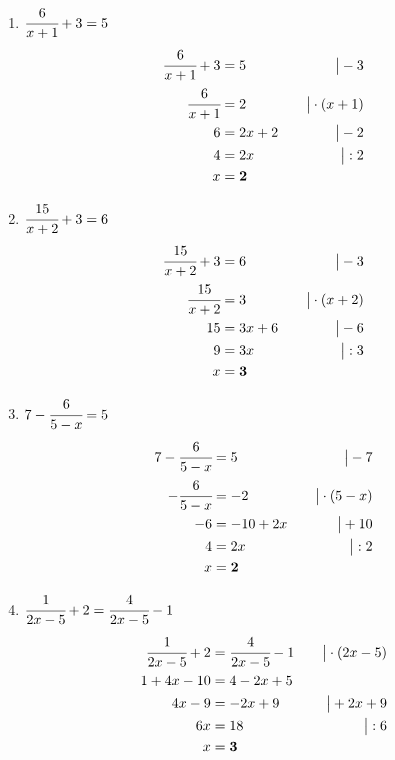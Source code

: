 \documentclass[a4paper,10pt]{article} %
\begin{document}
\begin{enumerate}[label=\alph*)]

  \item \(\cfrac{6}{x + 1} + 3 = 5\)
  \[
    \begin{aligned}
      \cfrac{6}{x + 1} + 3 &= 5 &\quad\big| - 3 \\
      \cfrac{6}{x + 1} &= 2 &\quad\big| \cdot (x + 1) \\
      6 &= 2x + 2 &\quad\big| - 2 \\
      4 &= 2x &\quad\big| : 2 \\
      x &= \mathbf{2}
    \end{aligned}
  \]

  \item \(\cfrac{15}{x + 2} + 3 = 6\)
  \[
    \begin{aligned}
      \cfrac{15}{x + 2} + 3 &= 6 &\quad\big| - 3 \\
      \cfrac{15}{x + 2} &= 3 &\quad\big| \cdot (x + 2) \\
      15 &= 3x + 6 &\quad\big| - 6 \\
      9 &= 3x &\quad\big| : 3 \\
      x &= \mathbf{3}
    \end{aligned}
  \]

  \item \(7 - \cfrac{6}{5 - x} = 5\)
  \[
    \begin{aligned}
      7 - \cfrac{6}{5 - x} &= 5 &\quad\big| - 7 \\
      - \cfrac{6}{5 - x } &= -2 &\quad\big| \cdot (5 - x) \\
      -6 &= -10 + 2x &\quad\big| + 10 \\
      4 &= 2x &\quad\big| : 2 \\
      x &= \mathbf{2}
    \end{aligned}
  \]

  \item \(\cfrac{1}{2x - 5} + 2 = \cfrac{4}{2x - 5} - 1\)
  \[
    \begin{aligned}
      \cfrac{1}{2x - 5} + 2 &= \cfrac{4}{2x - 5} - 1 &\quad\big| \cdot (2x - 5) \\
      1 + 4x - 10 &= 4 - 2x + 5 \\
      4x - 9 &= -2x + 9 &\quad\big| + 2x + 9 \\
      6x &= 18 &\quad\big| : 6 \\
      x &= \mathbf{3}
    \end{aligned}
  \]

\end{enumerate}
\end{document}
